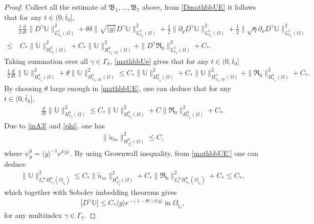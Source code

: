 \documentclass{amsart}
\numberwithin{equation}{section}
\newcommand\y{{{\langle y \rangle}}}
\begin{document}
\begin{proof}
Collect all the estimate of $\mathfrak{B}_{1},...,\mathfrak{B}_{7}$ above, from \eqref{DmathbbUE} it follows that for any $t\in(0,\bar{t}_{0}]$,
\begin{align}\label{mathbbUe}
&\frac{1}{2}\frac{d}{dt}\|D^{\gamma}\mathbb{U}\|_{L_{\psi_{\theta}}^{2}(\Omega)}^{2}
+\theta\delta\|\sqrt{\y}D^{\gamma}\mathbb{U}\|_{L_{\psi_{\theta}}^{2}(\Omega)}^{2}
+\frac{1}{2}\|\partial_{y}D^{\gamma}\mathbb{U}\|_{L_{\psi_{\theta}}^{2}(\Omega)}^{2}
+\frac{1}{2}\|\sqrt{\eta}\partial_{x}D^{\gamma}\mathbb{U}\|_{L_{\psi_{\theta}}^{2}(\Omega)}^{2}\\
\leq&~C_{*}\|\mathbb{U}\|_{H_{\psi_{\theta}}^{9}(\Omega)}^{2}
     +C_{*}\|\mathbb{U}\|_{H_{\psi_{\theta},\y}^{9}(\Omega)}^{2}
     +\|D^{\gamma}\mathfrak{R}_{0}\|_{L_{\psi_{\theta}}^{2}(\Omega)}^{2}
     +C_{*}.\nonumber
\end{align}
Taking summation over all $\gamma\in\Gamma_{8}$, \eqref{mathbbUe} gives that for any $t\in(0,\bar{t}_{0}]$
\begin{align}\label{mathbbUE}
\frac{1}{2}\frac{d}{dt}\|\mathbb{U}\|_{H_{\psi_{\theta}}^{9}(\Omega)}^{2}
+\theta\|\mathbb{U}\|_{H_{\psi_{\theta},\y}^{9}(\Omega)}^{2}
\leq C_{*}\|\mathbb{U}\|_{H_{\psi_{\theta}}^{9}(\Omega)}^{2}
    +C_{*}\|\mathbb{U}\|_{H_{\psi_{\theta},\y}^{9}(\Omega)}^{2}
    +\|\mathfrak{R}_{0}\|_{H_{\psi_{\theta}}^{9}(\Omega)}^{2}
    +C_{*}.
\end{align}
By choosing $\theta$ large enough in \eqref{mathbbUE}, one can deduce that for any $t\in(0,\bar{t}_{0}]$,
\begin{align}\label{mathbbUE'}
\frac{d}{dt}\|\mathbb{U}\|_{H_{\psi_{\theta}}^{9}(\Omega)}^{2}
\leq C_{*}\|\mathbb{U}\|_{H_{\psi_{\theta}}^{9}(\Omega)}^{2}
    +C\|\mathfrak{R}_{0}\|_{H_{\psi_{\theta}}^{9}(\Omega)}^{2}
    +C_{*}.
\end{align}
Due to \eqref{inA3} and \eqref{phi}, one has
\begin{align*}
\|\tilde{u}_{in}\|_{H_{\psi_{\theta}^{0}}^{9}(\Omega)}^{2}\leq C,
\end{align*}
where $\psi_{\theta}^{0}=\y^{-1}e^{\delta\y}$. By using Grownwall inequality, from \eqref{mathbbUE'} one can deduce
\begin{align*}
\|\mathbb{U}\|_{L_{t}^{\infty}H_{\psi_{\theta}}^{9}(\Omega_{\bar{t}_{0}})}^{2}
\leq C_{*}\|\tilde{u}_{in}\|_{H_{\psi_{\theta}^{0}}^{9}(\Omega)}^{2}
    +C_{*}\|\mathfrak{R}_{0}\|_{L_{t}^{\infty}H_{\psi_{\theta}}^{9}(\Omega_{\bar{t}_{0}})}^{2}
    +C_{*}
\leq C_{*},
\end{align*}
which together with Sobolev imbedding theorems gives
\begin{align}\label{Di0}
|D^{\gamma}\mathbb{U}|\leq C_{*}\y e^{-(1-\theta t)\delta\y}~\text{in}~\Omega_{\bar{t}_{0}},
\end{align}
for any multiindex $\gamma\in\Gamma_{7}$.


\end{proof}
\end{document}
